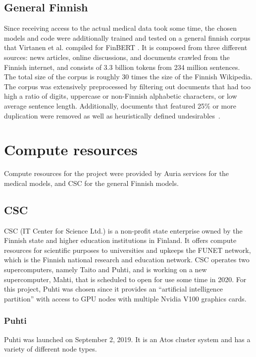 \subsection{General Finnish}\label{General Finnish}
Since receiving access to the actual medical data took some time, the chosen models and code were additionally trained and tested on a general finnish corpus that Virtanen et al. compiled for FinBERT \cite{virtanen2019}.
It is composed from three different sources: news articles, online discussions, and documents crawled from the Finnish internet, and consists of 3.3 billion tokens from 234 million sentences.
The total size of the corpus is roughly 30 times the size of the Finnish Wikipedia.
The corpus was extensively preprocessed by filtering out documents that had too high a ratio of digits, uppercase or non-Finnish alphabetic characters, or low average sentence length.
Additionally, documents that featured 25\% or more duplication were removed as well as heuristically defined undesirables~\cite{virtanen2019}.


\section{Compute resources} \label{Compute resources}
Compute resources for the project were provided by Auria services for the medical models, and CSC for the general Finnish models.

\subsection{CSC} \label{CSC}
CSC (IT Center for Science Ltd.) is a non-profit state enterprise owned by the Finnish state and higher education institutions in Finland.
It offers compute resources for scientific purposes to universities and upkeeps the FUNET network, which is the Finnish national research and education network.
CSC operates two supercomputers, namely Taito and Puhti, and is working on a new supercomputer, Mahti, that is scheduled to open for use some time in 2020.
For this project, Puhti was chosen since it provides an ``artificial intelligence partition'' with access to GPU nodes with multiple Nvidia V100 graphics cards.

\subsubsection{Puhti}\label{Puhti}
Puhti was launched on September 2, 2019.
It is an Atos cluster system and has a variety of different node types.

